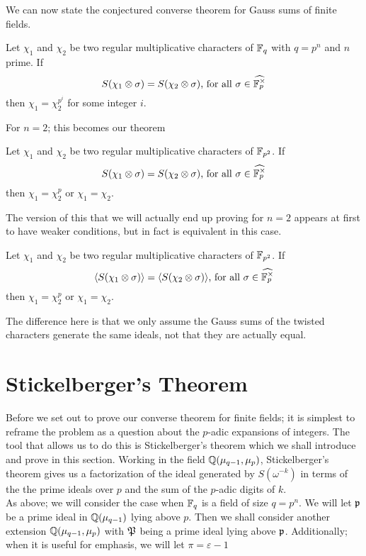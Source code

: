 We can now state the conjectured converse theorem for Gauss sums of finite fields.
\begin{conj}[Nien]\label{conj:local-converse-FF}
  Let $\chi_1$ and $\chi_2$ be two regular multiplicative characters of $\mathbb{F}_q$ with $q = p^n$ and $n$ prime.
  If \[S(\chi_1 \otimes \sigma) = S(\chi_2 \otimes \sigma)\text{, for all } \sigma \in \widehat{\mathbb{F}_p^\times}\] then $\chi_1 = \chi_2^{p^i}$ for some integer $i$.
\end{conj}

For $n=2$; this becomes our theorem 
\begin{theorem}\label{thm:local-converse-FF}
Let $\chi_1$ and $\chi_2$ be two regular multiplicative characters of $\mathbb{F}_{p^2}$. If \[S(\chi_1 \otimes \sigma) = S(\chi_2 \otimes \sigma)\text{, for all } \sigma \in \widehat{\mathbb{F}_p^\times}\] then $\chi_1 = \chi_2^{p}$ or $\chi_1 = \chi_2$.
\end{theorem}

The version of this that we will actually end up proving for $n = 2$ appears at first to have weaker conditions, but in fact is equivalent in this case.
\begin{theorem}\label{thm:local-converse-FF-ideal}
  Let $\chi_1$ and $\chi_2$ be two regular multiplicative characters of $\mathbb{F}_{p^2}$.
  If \[\langle S(\chi_1 \otimes \sigma) \rangle = \langle S(\chi_2 \otimes \sigma)\rangle\text{, for all } \sigma \in \widehat{\mathbb{F}_p^\times}\] then $\chi_1 = \chi_2^{p}$ or $\chi_1 = \chi_2$.
\end{theorem}
The difference here is that we only assume the Gauss sums of the twisted characters generate the same ideals, not that they are actually equal.

\section{Stickelberger's Theorem}
\label{sec:stickelberger}
Before we set out to prove our converse theorem for finite fields; it is simplest to reframe the problem as a question about the $p$-adic expansions of integers.
The tool that allows us to do this is Stickelberger's theorem which we shall introduce and prove in this section.
Working in the field $\mathbb{Q}(\mu_{q-1}, \mu_p)$, Stickelberger's theorem gives us a factorization of the ideal generated by $S(\omega^{-k})$ in terms of the the prime ideals over $p$ and the sum of the $p$-adic digits of $k$.
\\

As above; we will consider the case when $\mathbb{F}_q$ is a field of size $q = p^n$. 
We will let $\mathfrak{p}$ be a prime ideal in $\mathbb{Q}(\mu_{q-1})$ lying above $p$. 
Then we shall consider another extension $\mathbb{Q}(\mu_{q-1}, \mu_p)$ with $\mathfrak{P}$ being a prime ideal lying above $\mathfrak{p}$. Additionally; when it is useful for emphasis, we will let $\pi = \varepsilon - 1$
\\

